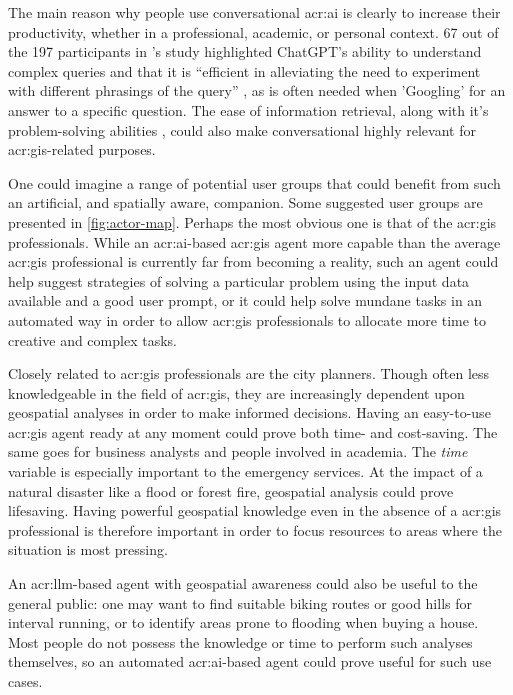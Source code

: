 The main reason why people use conversational \acrshort{acr:ai} is clearly to increase their productivity, whether in a professional, academic, or personal context. 67 out of the 197 participants in \citeauthor{skjuveWhyPeopleUse2023}'s study highlighted ChatGPT's ability to understand complex queries and that it is \enquote{efficient in alleviating the need to experiment with different phrasings of the query} \citep[18]{skjuveWhyPeopleUse2023}, as is often needed when 'Googling' for an answer to a specific question. The ease of information retrieval, along with it's problem-solving abilities \citep[20]{skjuveWhyPeopleUse2023}, could also make conversational  highly relevant for \acrshort{acr:gis}-related purposes.

One could imagine a range of potential user groups that could benefit from such an artificial, and spatially aware, companion. Some suggested user groups are presented in \autoref{fig:actor-map}. Perhaps the most obvious one is that of the \acrshort{acr:gis} professionals. While an \acrshort{acr:ai}-based \acrshort{acr:gis} agent more capable than the average \acrshort{acr:gis} professional is currently far from becoming a reality, such an agent could help suggest strategies of solving a particular problem using the input data available and a good user prompt, or it could help solve mundane tasks in an automated way in order to allow \acrshort{acr:gis} professionals to allocate more time to creative and complex tasks.

Closely related to \acrshort{acr:gis} professionals are the city planners. Though often less knowledgeable in the field of \acrshort{acr:gis}, they are increasingly dependent upon geospatial analyses in order to make informed decisions. Having an easy-to-use \acrshort{acr:gis} agent ready at any moment could prove both time- and cost-saving. The same goes for business analysts and people involved in academia. The \textit{time} variable is especially important to the emergency services. At the impact of a natural disaster like a flood or forest fire, geospatial analysis could prove lifesaving. Having powerful geospatial knowledge even in the absence of a \acrshort{acr:gis} professional is therefore important in order to focus resources to areas where the situation is most pressing.

An \acrshort{acr:llm}-based agent with geospatial awareness could also be useful to the general public: one may want to find suitable biking routes or good hills for interval running, or to identify areas prone to flooding when buying a house. Most people do not possess the knowledge or time to perform such analyses themselves, so an automated \acrshort{acr:ai}-based agent could prove useful for such use cases.



